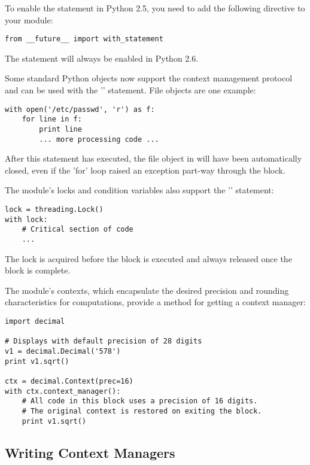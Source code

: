 \documentclass{howto}
\begin{document}
To enable the statement in Python 2.5, you need 
to add the following directive to your module:

\begin{verbatim}
from __future__ import with_statement
\end{verbatim}

The statement will always be enabled in Python 2.6.

Some standard Python objects now support the context management
protocol and can be used with the '' statement. File
objects are one example:

\begin{verbatim}
with open('/etc/passwd', 'r') as f:
    for line in f:
        print line
        ... more processing code ...
\end{verbatim}

After this statement has executed, the file object in  will
have been automatically closed, even if the 'for' loop
raised an exception part-way through the block.

The  module's locks and condition variables 
also support the '' statement:

\begin{verbatim}
lock = threading.Lock()
with lock:
    # Critical section of code
    ...
\end{verbatim}

The lock is acquired before the block is executed and always released once 
the block is complete.

The  module's contexts, which encapsulate the desired
precision and rounding characteristics for computations, provide a 
 method for getting a context manager:

\begin{verbatim}
import decimal

# Displays with default precision of 28 digits
v1 = decimal.Decimal('578')
print v1.sqrt()

ctx = decimal.Context(prec=16) 
with ctx.context_manager():
    # All code in this block uses a precision of 16 digits.
    # The original context is restored on exiting the block.
    print v1.sqrt()
\end{verbatim}

\subsection{Writing Context Managers\label{context-managers}}
\end{document}
